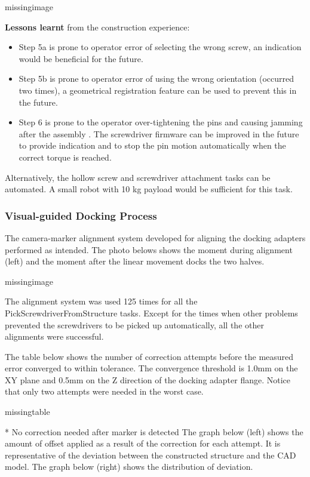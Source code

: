 missingimage

\textbf{Lessons learnt }from the construction experience:
\begin{itemize}
    \item Step 5a is prone to operator error of selecting the wrong screw, an indication would be beneficial for the future.
    \item Step 5b is prone to operator error of using the wrong orientation (occurred two times), a geometrical registration feature can be used to prevent this in the future.
    \item Step 6 is prone to the operator over-tightening the pins and causing jamming after the assembly . The screwdriver firmware can be improved in the future to provide indication and to stop the pin motion automatically when the correct torque is reached.
\end{itemize}

Alternatively, the hollow screw and screwdriver attachment tasks can be automated. A small robot with 10 kg payload would be sufficient for this task.

\subsubsection{Visual-guided Docking Process}
\label{subsubsection:exploration_4_visual_guided_docking_process}

The camera-marker alignment system developed for aligning the docking adapters performed as intended. The photo belows shows the moment during alignment (left) and the moment after the linear movement docks the two halves. 

missingimage

The alignment system was used 125 times for all the PickScrewdriverFromStructure tasks. Except for the times when other problems prevented the screwdrivers to be picked up automatically, all the other alignments were successful.

The table below shows the number of correction attempts before the measured error converged to within tolerance. The convergence threshold is 1.0mm on the XY plane and 0.5mm on the Z direction of the docking adapter flange. Notice that only two attempts were needed in the worst case.

missingtable

* No correction needed after marker is detected
The graph below (left) shows the amount of offset applied as a result of the correction for each attempt. It is representative of the deviation between the constructed structure and the CAD model. The graph below (right) shows the distribution of deviation.


